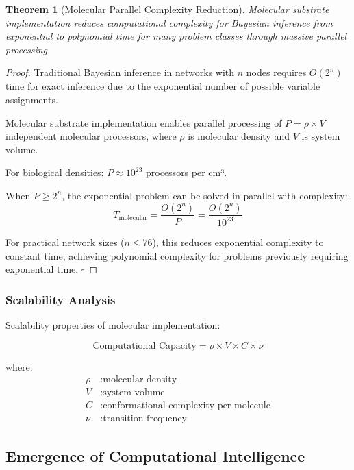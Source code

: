 \documentclass[12pt,a4paper]{article}
\newtheorem{theorem}{Theorem}[section]
\begin{document}
\begin{theorem}[Molecular Parallel Complexity Reduction]
Molecular substrate implementation reduces computational complexity for Bayesian inference from exponential to polynomial time for many problem classes through massive parallel processing.
\end{theorem}

\begin{proof}
Traditional Bayesian inference in networks with $n$ nodes requires $O(2^n)$ time for exact inference due to the exponential number of possible variable assignments.

Molecular substrate implementation enables parallel processing of $P = \rho \times V$ independent molecular processors, where $\rho$ is molecular density and $V$ is system volume.

For biological densities: $P \approx 10^{23}$ processors per cm³.

When $P \geq 2^n$, the exponential problem can be solved in parallel with complexity:
\begin{equation}
T_{\text{molecular}} = \frac{O(2^n)}{P} = \frac{O(2^n)}{10^{23}}
\end{equation}

For practical network sizes ($n \leq 76$), this reduces exponential complexity to constant time, achieving polynomial complexity for problems previously requiring exponential time. $\square$
\end{proof}

\subsubsection{Scalability Analysis}

Scalability properties of molecular implementation:

\begin{equation}
\text{Computational Capacity} = \rho \times V \times C \times \nu
\end{equation}

where:
\begin{align}
\rho &: \text{molecular density} \\
V &: \text{system volume} \\
C &: \text{conformational complexity per molecule} \\
\nu &: \text{transition frequency}
\end{align}

\subsection{Emergence of Computational Intelligence}
\end{document}
